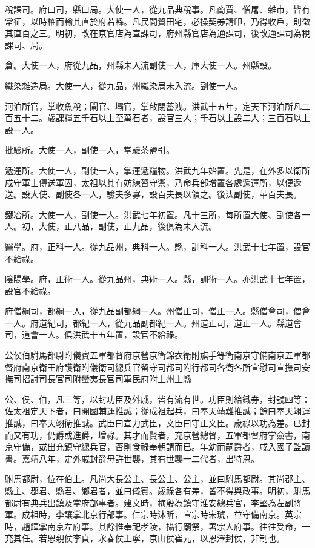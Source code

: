 稅課司。府曰司，縣曰局。大使一人，從九品典稅事。凡商賈、僧屠、雜市，皆有常征，以時榷而輸其直於府若縣。凡民間貿田宅，必操契券請印，乃得收戶，則徵其直百之三。明初，改在京官店為宣課司，府州縣官店為通課司，後改通課司為稅課司、局。

倉。大使一人，府從九品，州縣未入流副使一人，庫大使一人。州縣設。

織染雜造局。大使一人，從九品，州織染局未入流。副使一人。

河泊所官，掌收魚稅；閘官、壩官，掌啟閉蓄洩。洪武十五年，定天下河泊所凡二百五十二。歲課糧五千石以上至萬石者，設官三人；千石以上設二人；三百石以上設一人。

批驗所。大使一人，副使一人，掌驗茶鹽引。

遞運所。大使一人，副使一人，掌運遞糧物。洪武九年始置。先是，在外多以衛所戍守軍士傳送軍囚，太祖以其有妨練習守禦，乃命兵部增置各處遞運所，以便遞送。設大使、副使各一人，驗夫多寡，設百夫長以領之。後汰副使，革百夫長。

鐵冶所。大使一人，副使一人。洪武七年初置。凡十三所，每所置大使、副使各一人。初，大使，正八品，副使，正九品，後俱為未入流。

醫學。府，正科一人。從九品州，典科一人。縣，訓科一人。洪武十七年置，設官不給祿。

陰陽學。府，正術一人。從九品州，典術一人。縣，訓術一人。亦洪武十七年置，設官不給祿。

府僧綱司，都綱一人，從九品副都綱一人。州僧正司，僧正一人。縣僧會司，僧會一人。府道紀司，都紀一人，從九品副都紀一人。州道正司，道正一人。縣道會司，道會一人。俱洪武十五年置，設官不給祿。


公侯伯駙馬都尉附儀賓五軍都督府京營京衛錦衣衛附旗手等衛南京守備南京五軍都督府南京衛王府護衛附儀衛司總兵官留守司都司附行都司各衛各所宣慰司宣撫司安撫司招討司長官司附蠻夷長官司軍民府附土州土縣

公、侯、伯，凡三等，以封功臣及外戚，皆有流有世。功臣則給鐵券，封號四等：佐太祖定天下者，曰開國輔運推誠；從成祖起兵，曰奉天靖難推誠；餘曰奉天翊運推誠，曰奉天翊衛推誠。武臣曰宣力武臣，文臣曰守正文臣。歲祿以功為差。已封而又有功，仍爵或進爵，增祿。其才而賢者，充京營總督，五軍都督府掌僉書，南京守備，或出充鎮守總兵官，否則食祿奉朝請而已。年幼而嗣爵者，咸入國子監讀書。嘉靖八年，定外戚封爵毋許世襲，其有世襲一二代者，出特恩。

駙馬都尉，位在伯上。凡尚大長公主、長公主、公主，並曰駙馬都尉。其尚郡主、縣主、郡君、縣君、鄉君者，並曰儀賓。歲祿各有差，皆不得與政事。明初，駙馬都尉有典兵出鎮及掌府部事者。建文時，梅殷為鎮守淮安總兵官，李堅為左副將軍。成祖時，李讓掌北京行部事。仁宗時沐昕，宣宗時宋琥，並守備南京。英宗時，趙輝掌南京左府事。其餘惟奉祀孝陵，攝行廟祭，署宗人府事。往往受命，一充其任。若恩親侯李貞，永春侯王寧，京山侯崔元，以恩澤封侯，非制也。

